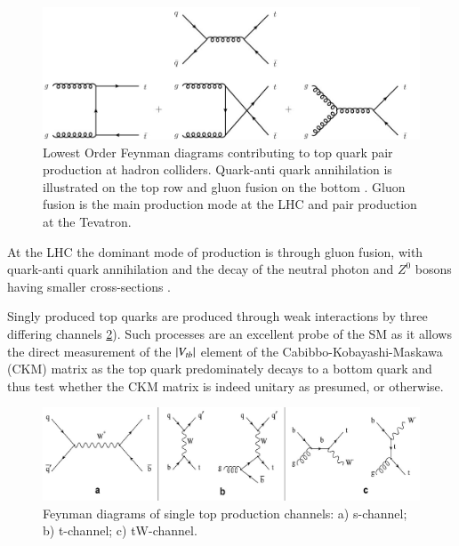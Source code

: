 \begin{figure}[htbp]
\begin{center}
\includegraphics[width=1.00\textwidth]{figs/top-physics/ttbar_feyn.jpg}
\caption{Lowest Order Feynman diagrams contributing to top quark pair production at hadron colliders. Quark-anti quark annihilation is illustrated on the top row and gluon fusion on the bottom . Gluon fusion is the main production mode at the LHC and pair production at the Tevatron.}
\label{fig:feyn_ttbar}
\end{center}
\end{figure}

At the LHC the dominant mode of production is through gluon fusion, with quark-anti quark annihilation and the decay of the neutral photon and $Z^{0}$ bosons having smaller cross-sections .

Singly produced top quarks are produced through weak interactions by three differing channels \ref{fig:feyn_singletop}).
Such processes are an excellent probe of the SM as it allows the direct measurement of the $\lvert V_{tb}\rvert$ element of the Cabibbo-Kobayashi-Maskawa (CKM) matrix as the top quark predominately decays to a bottom quark and thus test whether the CKM matrix is indeed unitary as presumed, or otherwise.

\begin{figure}[htbp]
\begin{center}
\includegraphics[width=1.00\textwidth]{figs/top-physics/singletop_feyn.jpg}
\caption{Feynman diagrams of single top production channels: a) s-channel; b) t-channel; c) tW-channel.}
\label{fig:feyn_singletop}
\end{center}
\end{figure}

